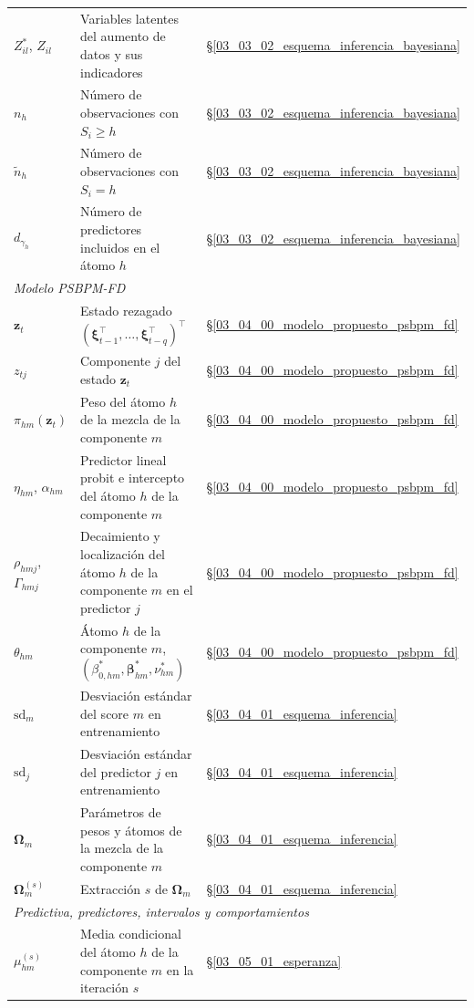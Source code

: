 \begin{longtable}{p{} p{} p{}}
$Z_{il}^*$, $Z_{il}$ & Variables latentes del aumento de datos y sus indicadores & \S\ref{03_03_02_esquema_inferencia_bayesiana} \\
$n_h$ & Número de observaciones con $S_i \geq h$ & \S\ref{03_03_02_esquema_inferencia_bayesiana} \\
$\tilde{n}_h$ & Número de observaciones con $S_i = h$ & \S\ref{03_03_02_esquema_inferencia_bayesiana} \\
$d_{\gamma_h}$ & Número de predictores incluidos en el átomo $h$ & \S\ref{03_03_02_esquema_inferencia_bayesiana} \\
\hline
\multicolumn{3}{l}{\textit{Modelo PSBPM-FD}} \\
\hline
$\mathbf{z}_t$ & Estado rezagado $(\boldsymbol{\xi}_{t-1}^\top, \dots, \boldsymbol{\xi}_{t-q}^\top)^\top$ & \S\ref{03_04_00_modelo_propuesto_psbpm_fd} \\
$z_{tj}$ & Componente $j$ del estado $\mathbf{z}_t$ & \S\ref{03_04_00_modelo_propuesto_psbpm_fd} \\
$\pi_{hm}(\mathbf{z}_t)$ & Peso del átomo $h$ de la mezcla de la componente $m$ & \S\ref{03_04_00_modelo_propuesto_psbpm_fd} \\
$\eta_{hm}$, $\alpha_{hm}$ & Predictor lineal probit e intercepto del átomo $h$ de la componente $m$ & \S\ref{03_04_00_modelo_propuesto_psbpm_fd} \\
$\rho_{hmj}$, $\Gamma_{hmj}$ & Decaimiento y localización del átomo $h$ de la componente $m$ en el predictor $j$ & \S\ref{03_04_00_modelo_propuesto_psbpm_fd} \\
$\theta_{hm}$ & Átomo $h$ de la componente $m$, $(\beta_{0,hm}^*, \boldsymbol{\beta}_{hm}^*, \nu_{hm}^*)$ & \S\ref{03_04_00_modelo_propuesto_psbpm_fd} \\
$\mathrm{sd}_m$ & Desviación estándar del score $m$ en entrenamiento & \S\ref{03_04_01_esquema_inferencia} \\
$\mathrm{sd}_j$ & Desviación estándar del predictor $j$ en entrenamiento & \S\ref{03_04_01_esquema_inferencia} \\
$\boldsymbol{\Omega}_m$ & Parámetros de pesos y átomos de la mezcla de la componente $m$ & \S\ref{03_04_01_esquema_inferencia} \\
$\boldsymbol{\Omega}_m^{(s)}$ & Extracción $s$ de $\boldsymbol{\Omega}_m$ & \S\ref{03_04_01_esquema_inferencia} \\
\hline
\multicolumn{3}{l}{\textit{Predictiva, predictores, intervalos y comportamientos}} \\
\hline
$\mu_{hm}^{(s)}$ & Media condicional del átomo $h$ de la componente $m$ en la iteración $s$ & \S\ref{03_05_01_esperanza} \\

\end{longtable}
